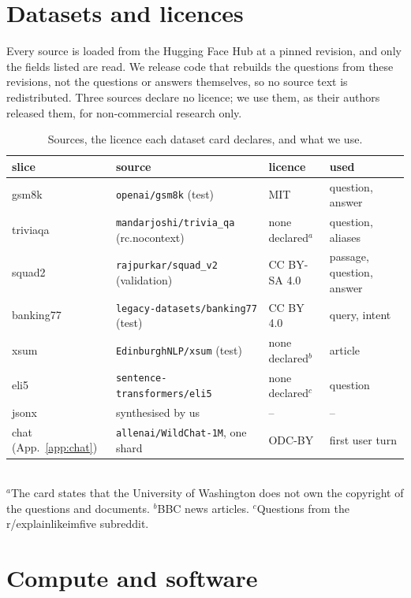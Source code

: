 \documentclass{article}
\begin{document}
\section{Datasets and licences}
\label{app:data}
Every source is loaded from the Hugging Face Hub at a pinned revision, and only
the fields listed are read. We release code that rebuilds the questions from these
revisions, not the questions or answers themselves, so no source text is
redistributed. Three sources declare no licence; we use them, as their authors
released them, for non-commercial research only.

\begin{table}[h]
  \centering\small
  \caption{Sources, the licence each dataset card declares, and what we use.}
  \label{tab:data}
  \begin{tabular}{llll}
    \toprule
    slice & source & licence & used \\
    \midrule
    \textsf{gsm8k} & \texttt{openai/gsm8k} (test) & MIT & question, answer \\
    \textsf{triviaqa} & \texttt{mandarjoshi/trivia\_qa} (rc.nocontext) & none declared$^a$ & question, aliases \\
    \textsf{squad2} & \texttt{rajpurkar/squad\_v2} (validation) & CC BY-SA 4.0 & passage, question, answer \\
    \textsf{banking77} & \texttt{legacy-datasets/banking77} (test) & CC BY 4.0 & query, intent \\
    \textsf{xsum} & \texttt{EdinburghNLP/xsum} (test) & none declared$^b$ & article \\
    \textsf{eli5} & \texttt{sentence-transformers/eli5} & none declared$^c$ & question \\
    \textsf{jsonx} & synthesised by us & -- & -- \\
    chat (App.~\ref{app:chat}) & \texttt{allenai/WildChat-1M}, one shard & ODC-BY & first user turn \\
    \bottomrule
  \end{tabular}\\[2pt]
  {\footnotesize $^a$The card states that the University of Washington does not own
  the copyright of the questions and documents. $^b$BBC news articles.
  $^c$Questions from the r/explainlikeimfive subreddit.}
\end{table}

\section{Compute and software}
\label{app:compute}
\end{document}
